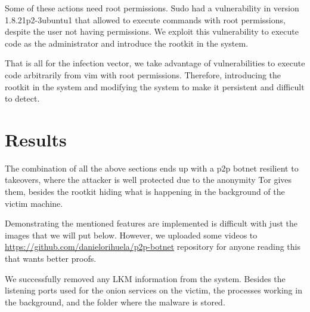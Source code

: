 \documentclass[11pt, a4paper,twoside]{tesi_upf}
\begin{document}
Some of these actions need root permissions. Sudo had a vulnerability in version 1.8.21p2-3ubuntu1 that allowed to execute commands with root permissions, despite the user not having permissions. We exploit this vulnerability to execute code as the administrator and introduce the rootkit in the system.

That is all for the infection vector, we take advantage of vulnerabilities to execute code arbitrarily from vim with root permissions. Therefore, introducing the rootkit in the system and modifying the system to make it persistent and difficult to detect.

\chapter{Results}

The combination of all the above sections ends up with a p2p botnet resilient to takeovers, where the attacker is well protected due to the anonymity Tor gives them, besides the rootkit hiding what is happening in the background of the victim machine.

Demonstrating the mentioned features are implemented is difficult with just the images that we will put below. However, we uploaded some videos to \url{https://github.com/danielorihuela/p2p-botnet} repository for anyone reading this that wants better proofs.

We successfully removed any LKM information from the system. Besides the listening ports used for the onion services on the victim, the processes working in the background, and the folder where the malware is stored.
\end{document}
